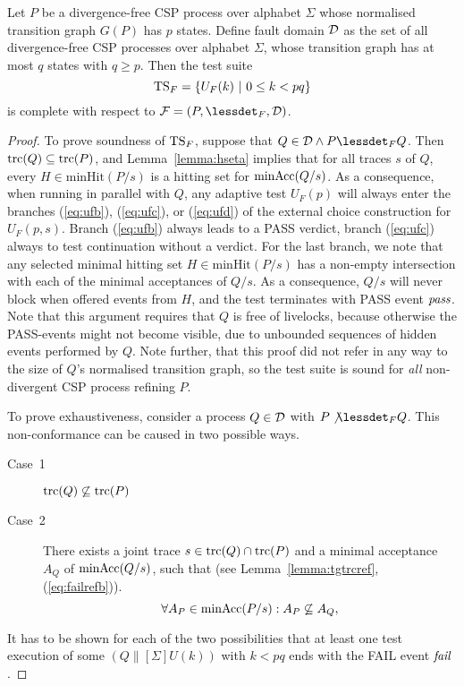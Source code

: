 \begin{theorem}\label{th:failurestest}
Let $P$ be a divergence-free CSP process over alphabet $\Sigma$ 
whose normalised transition graph $G(P)$ has $p$ states. Define fault domain ${\cal D}$ as
the set of all divergence-free CSP processes over alphabet $\Sigma$, whose transition graph
has at most $q$ states with $q \ge p$. 
Then the test suite 
\[
{\text{TS}}_F = \{ U_F(k)~|~0 \le k < pq  \}
\]
is complete with respect to ${\cal F} = (P,\lessdet_F,{\cal D})$.
\end{theorem}
\begin{proof}
To prove soundness of ${\text{TS}}_F$, suppose that $Q\in{\cal D} \wedge P\lessdet_F Q$. Then
$\text{trc}(Q)\subseteq \text{trc}(P)$, and Lemma~\ref{lemma:hseta} implies that 
for all traces $s$ of $Q$, every $H\in\text{minHit}(P/s)$ is a 
    hitting set for $\text{minAcc}(Q/s)$. As a consequence, when running in parallel
with $Q$, any adaptive test $U_F(p)$ will always enter the branches 
(\ref{eq:ufb}), (\ref{eq:ufc}),  or (\ref{eq:ufd}) of the external choice construction
for $U_F(p,s)$. Branch (\ref{eq:ufb}) always leads to a PASS verdict, branch (\ref{eq:ufc})
always to test continuation without a verdict. For the last branch, we note that 
any selected minimal hitting set $H\in\text{minHit}(P/s)$ has a non-empty intersection with
each of the minimal acceptances of $Q/s$. As a consequence, $Q/s$ will never block when offered events from $H$, and the test terminates with PASS event ${\text{\it pass}}$. Note that this argument requires that $Q$ is free of livelocks, because otherwise the PASS-events might not become visible, due to unbounded sequences of hidden events performed by $Q$. Note further, that this proof did not refer in any way to the size of $Q$'s normalised transition graph, so the test suite is sound for {\it all} non-divergent CSP process refining $P$.

To prove exhaustiveness, consider a process $Q\in{\cal D}$ with $P\not\lessdet_F Q$. This non-conformance can be caused in two possible ways.
\begin{description}
\item[Case~1] $\text{trc}(Q)\not\subseteq \text{trc}(P)$
\item[Case~2] There exists a joint trace $s\in\text{trc}(Q)\cap\text{trc}(P)$ and a minimal acceptance $A_Q$
of $\text{minAcc}(Q/s)$, such that 
(see Lemma~\ref{lemma:tgtrcref}, (\ref{eq:failrefb})).
\begin{equation}
\label{eq:accsnotcontained}
\forall A_P\in\text{minAcc}(P/s): A_P\not\subseteq A_Q,
\end{equation} 
\end{description}
It has to be shown for each of the two possibilities that at least one test execution of some $(Q\parallel[\Sigma] U(k))$ with $k < pq$ ends with the FAIL event ${\text{\it fail}}$.


\end{proof}
